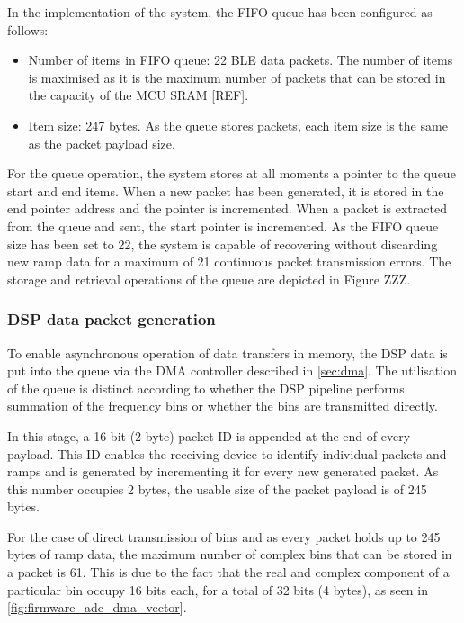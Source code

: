 In the implementation of the system, the FIFO queue has been configured as follows:
\begin{itemize}
	\item Number of items in FIFO queue: 22 BLE data packets. The number of items is maximised as it is the maximum number of packets that can be stored in the capacity of the MCU SRAM [REF].
	\item Item size: 247 bytes. As the queue stores packets, each item size is the same as the packet payload size.
\end{itemize}

For the queue operation, the system stores at all moments a pointer to the queue start and end items. When a new packet has been generated, it is stored in the end pointer address and the pointer is incremented. When a packet is extracted from the queue and sent, the start pointer is incremented. As the FIFO queue size has been set to 22, the system is capable of recovering without discarding new ramp data for a maximum of 21 continuous packet transmission errors.
The storage and retrieval operations of the queue are depicted in Figure ZZZ.

\subsubsection{DSP data packet generation} \label{sec:packet_generation}

To enable asynchronous operation of data transfers in memory, the DSP data is put into the queue via the DMA controller described in \cref{sec:dma}. The utilisation of the queue is distinct according to whether the DSP pipeline performs summation of the frequency bins or whether the bins are transmitted directly.

In this stage, a 16-bit (2-byte) packet ID is appended at the end of every payload. This ID enables the receiving device to identify individual packets and ramps and is generated by incrementing it for every new generated packet. As this number occupies 2 bytes, the usable size of the packet payload is of 245 bytes.

For the case of direct transmission of bins and as every packet holds up to 245 bytes of ramp data, the maximum number of complex bins that can be stored in a packet is 61. This is due to the fact that the real and complex component of a particular bin occupy 16 bits each, for a total of 32 bits (4 bytes), as seen in \cref{fig:firmware_adc_dma_vector}.

